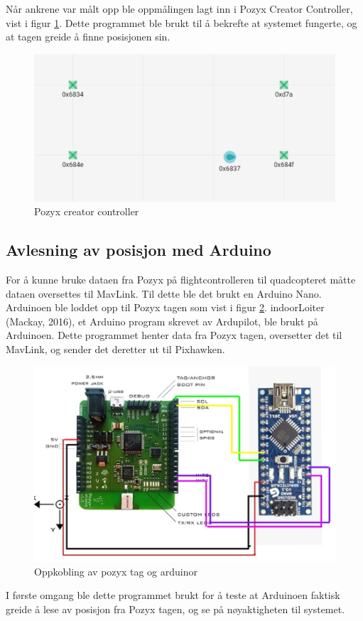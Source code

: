 Når ankrene var målt opp ble oppmålingen lagt inn i Pozyx Creator Controller, vist i figur \ref{fig:creator-controller}. 
Dette programmet ble brukt til å bekrefte at systemet fungerte, og at tagen greide å finne posisjonen sin.

\begin{figure}[htp]
\centering
\includegraphics[width=0.5\columnwidth]{figures/creator-controller}
\caption{Pozyx creator controller}
\label{fig:creator-controller}
\end{figure}

\subsection{Avlesning av posisjon med Arduino}
For å kunne bruke dataen fra Pozyx på flightcontrolleren til quadcopteret måtte dataen oversettes til MavLink. 
Til dette ble det brukt en Arduino Nano. Arduinoen ble loddet opp til Pozyx tagen som vist i figur \ref{fig:arduino-tag}.
indoorLoiter (Mackay, 2016), et Arduino program skrevet av Ardupilot, ble brukt på Arduinoen. 
Dette programmet henter data fra Pozyx tagen, oversetter det til MavLink, og sender det deretter ut til Pixhawken.

\begin{figure}[htp]
\centering
\includegraphics[width=0.5\columnwidth]{figures/oppkobling2}
\caption{Oppkobling av pozyx tag og arduinor}
\label{fig:arduino-tag}
\end{figure}
 
I første omgang ble dette programmet brukt for å teste at Arduinoen faktisk greide å lese av posisjon fra Pozyx tagen, 
og se på nøyaktigheten til systemet.

